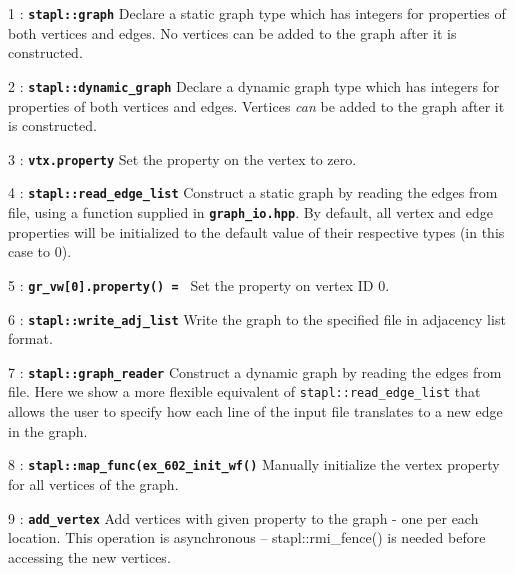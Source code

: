 \documentclass{report}
\begin{document}
\begin{hashitemize}
\item 1 : \texttt{{\bf stapl::graph}}
\newline
Declare a static graph type which has integers for properties of both
vertices and edges.  No vertices can be added to the graph after it
is constructed.

\item 2 : \texttt{{\bf stapl::dynamic\_graph}}
\newline
Declare a dynamic graph type which has integers for properties of both
vertices and edges.  Vertices \emph{can} be added to the graph after it
is constructed.

\item 3 : \texttt{{\bf vtx.property}}
\newline
Set the property on the vertex to zero.

\item 4 : \texttt{{\bf stapl::read\_edge\_list}}
\newline
Construct a static graph by reading the edges from file, using
a function supplied in \texttt{{\bf graph\_io.hpp}}. By default, all vertex and
edge properties will be initialized to the default value of their
respective types (in this case to 0).

\item 5 : \texttt{{\bf gr\_vw[0].property() = }}
\newline
Set the property on vertex ID 0.

\item 6 : \texttt{{\bf stapl::write\_adj\_list}}
\newline
Write the graph to the specified file in adjacency list format.

\item 7 : \texttt{{\bf stapl::graph\_reader}}
\newline
Construct a dynamic graph by reading the edges from file. Here we show a more
flexible equivalent of \texttt{stapl::read\_edge\_list} that allows the user to
specify how each line of the input file translates to a new edge in the graph.

\item 8 : \texttt{{\bf stapl::map\_func(ex\_602\_init\_wf()}}
\newline
Manually initialize the vertex property for all vertices of the graph.

\item 9 : \texttt{{\bf add\_vertex}}
\newline
Add vertices with given property to the graph - one per each location. This
operation is asynchronous -- stapl::rmi\_fence() is needed before accessing the
new vertices.


\end{hashitemize}
\end{document}
